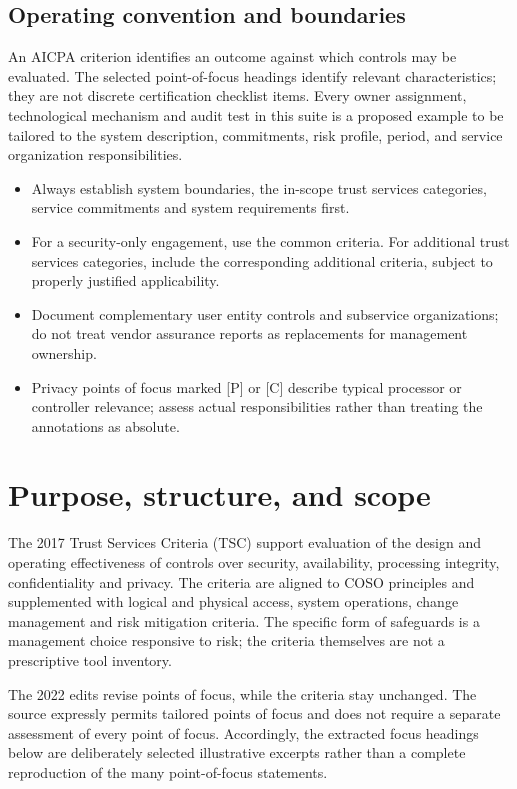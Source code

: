 \documentclass[10pt,oneside]{report}
\begin{document}
\section*{Operating convention and boundaries}
An AICPA criterion identifies an outcome against which controls may be evaluated. The selected point-of-focus headings identify relevant characteristics; they are not discrete certification checklist items. Every owner assignment, technological mechanism and audit test in this suite is a proposed example to be tailored to the system description, commitments, risk profile, period, and service organization responsibilities.

\begin{itemize}
\item Always establish system boundaries, the in-scope trust services categories, service commitments and system requirements first.
\item For a security-only engagement, use the common criteria. For additional trust services categories, include the corresponding additional criteria, subject to properly justified applicability.
\item Document complementary user entity controls and subservice organizations; do not treat vendor assurance reports as replacements for management ownership.
\item Privacy points of focus marked [P] or [C] describe typical processor or controller relevance; assess actual responsibilities rather than treating the annotations as absolute.
\end{itemize}

\chapter{Purpose, structure, and scope}
The 2017 Trust Services Criteria (TSC) support evaluation of the design and operating effectiveness of controls over security, availability, processing integrity, confidentiality and privacy. The criteria are aligned to COSO principles and supplemented with logical and physical access, system operations, change management and risk mitigation criteria. The specific form of safeguards is a management choice responsive to risk; the criteria themselves are not a prescriptive tool inventory.

The 2022 edits revise points of focus, while the criteria stay unchanged. The source expressly permits tailored points of focus and does not require a separate assessment of every point of focus. Accordingly, the extracted focus headings below are deliberately selected illustrative excerpts rather than a complete reproduction of the many point-of-focus statements.
\end{document}
